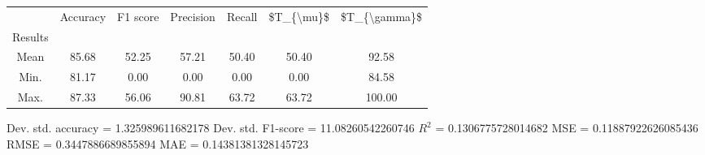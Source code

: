 \begin{tabular}{|c|c|c|c|c|c|c|}
\toprule
{} &  Accuracy &  F1 score &  Precision &  Recall &  \$T\_\{\textbackslash mu\}\$ &  \$T\_\{\textbackslash gamma\}\$ \\
Results &           &           &            &         &            &               \\
\hline
Mean    &     85.68 &     52.25 &      57.21 &   50.40 &      50.40 &         92.58 \\
Min.    &     81.17 &      0.00 &       0.00 &    0.00 &       0.00 &         84.58 \\
Max.    &     87.33 &     56.06 &      90.81 &   63.72 &      63.72 &        100.00 \\
\bottomrule
\end{tabular}

 Dev. std. accuracy = 1.325989611682178
 Dev. std. F1-score = 11.08260542260746
 $R^2$ = 0.1306775728014682
 MSE = 0.11887922626085436
 RMSE = 0.3447886689855894
 MAE = 0.14381381328145723